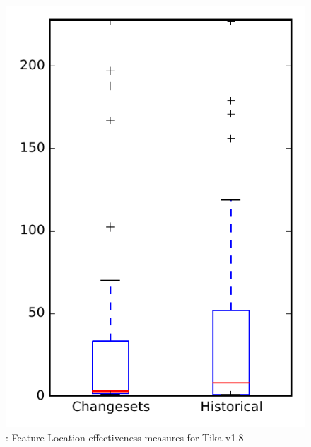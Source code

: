 
\begin{figure}
\centering
\includegraphics[height=0.4\textheight]{figures/flt/rq2_tika}
\caption{\ftwo: Feature Location effectiveness measures for Tika v1.8}
\label{fig:flt:rq2:tika}
\end{figure}
